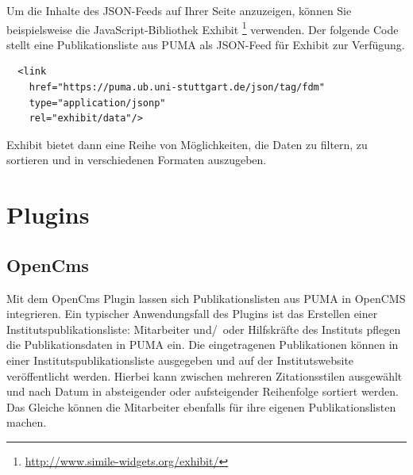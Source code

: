 Um die Inhalte des  JSON-Feeds auf Ihrer Seite anzuzeigen, können Sie beispielsweise die JavaScript-Bibliothek Exhibit \footnote{\url{http://www.simile-widgets.org/exhibit/}} verwenden. Der folgende Code stellt eine Publikationsliste aus PUMA als JSON-Feed für Exhibit zur Verfügung.

\lstset{language=HTML}
\begin{lstlisting}
  <link
    href="https://puma.ub.uni-stuttgart.de/json/tag/fdm"
    type="application/jsonp"
    rel="exhibit/data"/> 
\end{lstlisting}

Exhibit bietet dann eine Reihe von Möglichkeiten, die Daten zu filtern, zu sortieren und in verschiedenen Formaten auszugeben.

\section{Plugins} 
\label{sec:plugins}
\subsection{OpenCms}
\label{subsec:opencms}
Mit dem OpenCms Plugin lassen sich Publikationslisten aus PUMA in OpenCMS integrieren. Ein typischer Anwendungsfall des Plugins ist das Erstellen einer Instituts\-publi\-kations\-liste: Mitarbeiter und/~oder Hilfskräfte des Instituts pflegen die Publikationsdaten in PUMA ein. Die eingetragenen Publikationen können in einer Instituts\-publi\-kations\-liste ausgegeben und auf der Instituts\-website veröffentlicht werden. Hierbei kann zwischen mehreren Zitationsstilen ausgewählt und nach Datum in absteigender oder aufsteigender Reihenfolge sortiert werden. Das Gleiche können die Mitarbeiter ebenfalls für ihre eigenen Publikationslisten machen.
